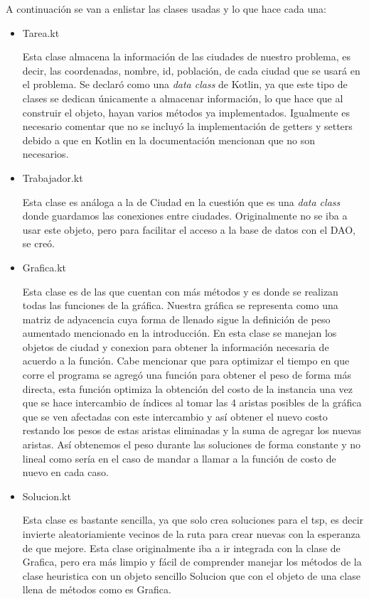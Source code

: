 \documentclass{article}
\begin{document}
A continuación se van a enlistar las clases usadas y lo que hace cada una:
\begin{itemize}
	\item {Tarea.kt
		
		Esta clase almacena la información de las ciudades de nuestro problema, es decir, las coordenadas, nombre, id, población, de cada ciudad que se usará en el problema. Se declaró como una \emph{data class} de Kotlin, ya que este tipo de clases se dedican únicamente a almacenar información, lo que hace que al construir el objeto, hayan varios métodos ya implementados. Igualmente es necesario comentar que no se incluyó la implementación de getters y setters debido a que en Kotlin en la documentación mencionan que no son necesarios.
	}
	\item {Trabajador.kt
		
		Esta clase es análoga a la de Ciudad en la cuestión que es una \emph{data class} donde guardamos las conexiones entre ciudades. Originalmente no se iba a usar este objeto, pero para facilitar el acceso a la base de datos con el DAO, se creó.
	}
	\item {Grafica.kt
		
		Esta clase es de las que cuentan con más métodos y es donde se realizan todas las funciones de la gráfica. Nuestra gráfica se representa como una matriz de adyacencia cuya forma de llenado sigue la definición de peso aumentado mencionado en la introducción. En esta clase se manejan los objetos de ciudad y conexion para obtener la información necesaria de acuerdo a la función. Cabe mencionar que para optimizar el tiempo en que corre el programa se agregó una función para obtener el peso de forma más directa, esta función optimiza la obtención del costo de la instancia una vez que se hace intercambio de índices al tomar las 4 aristas posibles de la gráfica que se ven afectadas con este intercambio y así obtener el nuevo costo restando los pesos de estas aristas eliminadas y la suma de agregar los nuevas aristas. Así obtenemos el peso durante las soluciones de forma constante y no lineal como sería en el caso de mandar a llamar a la función de costo de nuevo en cada caso.
	}
	\item {Solucion.kt
		
		Esta clase es bastante sencilla, ya que solo crea soluciones para el tsp, es decir invierte aleatoriamiente vecinos de la ruta para crear nuevas con la esperanza de que mejore. Esta clase originalmente iba a ir integrada con la clase de Grafica, pero era más limpio y fácil de comprender manejar los métodos de la clase heuristica con un objeto sencillo Solucion que con el objeto de una clase llena de métodos como es Grafica.
	
}
\end{itemize}
\end{document}
